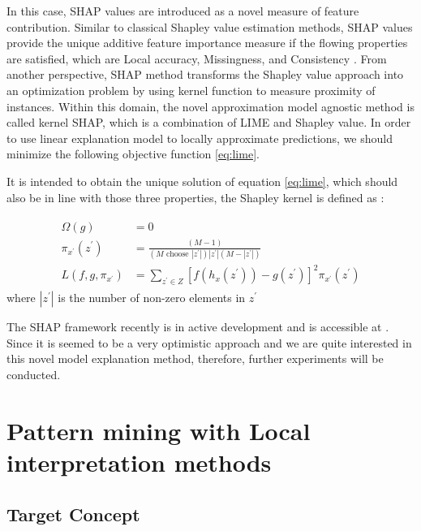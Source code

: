 In this case, SHAP values are introduced as a novel measure of feature contribution. Similar to classical Shapley value estimation methods, SHAP values provide the unique additive feature importance measure if the flowing properties are satisfied, which are Local accuracy, Missingness, and Consistency \cite{lundberg2017unified}. From another perspective, SHAP method transforms the Shapley value approach into an optimization problem by using kernel function to measure proximity of instances. Within this domain, the novel approximation model agnostic method is called kernel SHAP, which is a combination of LIME and Shapley value. In order to use linear explanation model to locally approximate predictions, we should minimize the following objective function \ref{eq:lime}. 

It is intended to obtain the unique solution of equation \ref{eq:lime}, which should also be in line with those three properties, the Shapley kernel is defined as \cite{lundberg2017unified}:

\begin{equation} \label{eq:shap_kernel}
\begin{gathered}
\begin{aligned} \Omega(g) &=0 \\ \pi_{x^{\prime}}\left(z^{\prime}\right) &=\frac{(M-1)}{\left(M \text { choose }\left|z^{\prime}\right|\right)\left|z^{\prime}\right|\left(M-\left|z^{\prime}\right|\right)} \\ L\left(f, g, \pi_{x^{\prime}}\right) &=\sum_{z^{\prime} \in Z}\left[f\left(h_{x}\left(z^{\prime}\right)\right)-g\left(z^{\prime}\right)\right]^{2} \pi_{x^{\prime}}\left(z^{\prime}\right) \end{aligned}
\end{gathered}
\end{equation}
where $|z^\prime|$ is the number of non-zero elements in $z^\prime$

The SHAP framework recently is in active development and is accessible at \cite{shap}. Since it is seemed to be a very optimistic approach and we are quite interested in this novel model explanation method, therefore, further experiments will be conducted. 

\section{Pattern mining with Local interpretation methods}

\subsection{Target Concept}

